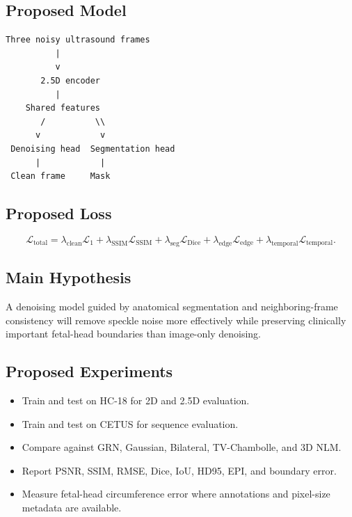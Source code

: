 \documentclass[11pt,a4paper]{article}
\begin{document}
\subsection{Proposed Model}

\begin{verbatim}
Three noisy ultrasound frames
          |
          v
       2.5D encoder
          |
    Shared features
       /          \\
      v            v
 Denoising head  Segmentation head
      |            |
 Clean frame     Mask
\end{verbatim}

\subsection{Proposed Loss}

\begin{equation}
    \mathcal{L}_{\mathrm{total}}
    = \lambda_{\mathrm{clean}}\mathcal{L}_{1}
    + \lambda_{\mathrm{SSIM}}\mathcal{L}_{\mathrm{SSIM}}
    + \lambda_{\mathrm{seg}}\mathcal{L}_{\mathrm{Dice}}
    + \lambda_{\mathrm{edge}}\mathcal{L}_{\mathrm{edge}}
    + \lambda_{\mathrm{temporal}}\mathcal{L}_{\mathrm{temporal}}.
\end{equation}

\subsection{Main Hypothesis}

A denoising model guided by anatomical segmentation and neighboring-frame consistency will remove speckle noise more effectively while preserving clinically important fetal-head boundaries than image-only denoising.

\subsection{Proposed Experiments}

\begin{itemize}
    \item Train and test on HC-18 for 2D and 2.5D evaluation.
    \item Train and test on CETUS for sequence evaluation.
    \item Compare against GRN, Gaussian, Bilateral, TV-Chambolle, and 3D NLM.
    \item Report PSNR, SSIM, RMSE, Dice, IoU, HD95, EPI, and boundary error.
    \item Measure fetal-head circumference error where annotations and pixel-size metadata are available.
\end{itemize}
\end{document}
